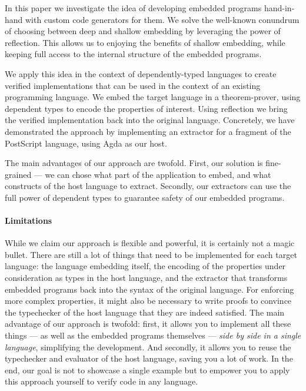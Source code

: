 \documentclass[sigplan,anonymous,review]{acmart}
\begin{document}
In this paper we investigate the idea of developing
embedded programs hand-in-hand with custom
code generators for them. We solve the well-known
conundrum of choosing between deep and shallow
embedding by leveraging the power of
reflection.
This allows us to enjoying the benefits
of shallow embedding, while keeping full access to the internal
structure of the embedded programs.

We apply this idea in the context of dependently-typed
languages to create verified implementations that can
be used in the context of an existing programming language.
We embed the target language in a theorem-prover, using
dependent types to encode the properties of interest.
Using reflection we bring the verified implementation
back into the original language.
%
Concretely, we have demonstrated the approach by implementing
an extractor for a fragment of the PostScript language, using
Agda as our host.

The main advantages of our approach are twofold.  First,
our solution is fine-grained --- we can chose what part
of the application to embed, and what constructs of the
host language to extract.  Secondly, our extractors
can use the full power of dependent types to guarantee
safety of our embedded programs.

\paragraph{Limitations}
While we claim our approach is flexible and powerful, it is
certainly not a magic bullet. There are still a lot of things that
need to be implemented for each target language: the language
embedding itself, the encoding of the properties under consideration
as types in the host language, and the extractor that transforms
embedded programs back into the syntax of the original language.  For
enforcing more complex properties, it might also be necessary to write
proofs to convince the typechecker of the host language that they are
indeed satisfied.
%
The main advantage of our approach is twofold: first, it allows
you to implement all these things --- as well as the embedded programs
themselves --- \emph{side by side in a single language}, simplifying
the development. And secondly, it allows you to reuse the typechecker
and evaluator of the host language, saving you a lot of work.  In the
end, our goal is not to showcase a single example but to empower you
to apply this approach yourself to verify code in any language.
\end{document}
